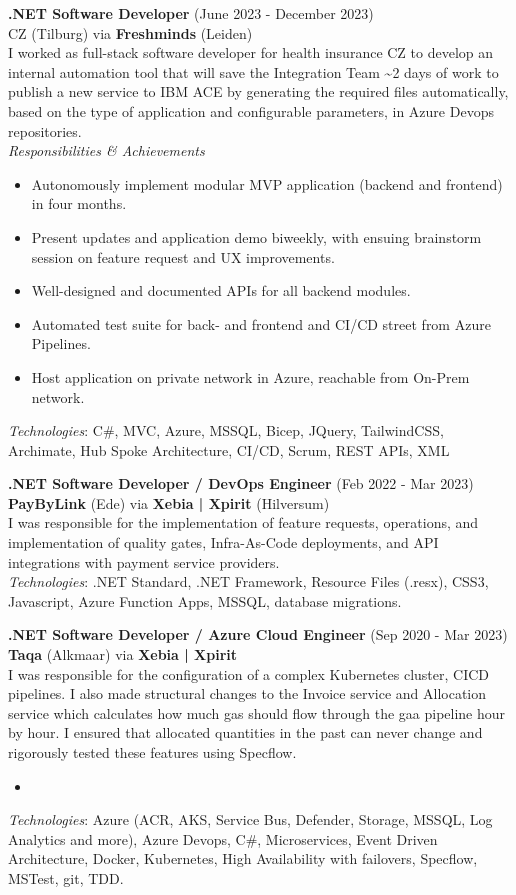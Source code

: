 \documentclass[a4paper,8pt]{article}
\begin{document}
\textbf{.NET Software Developer} (June 2023 - December 2023) \\
CZ (Tilburg) via \textbf{Freshminds} (Leiden) \\
I worked as full-stack software developer for health insurance CZ to develop an internal automation tool that will save the Integration Team \textasciitilde 2 days of work to publish a new service to IBM ACE by generating the required files automatically, based on the type of application and configurable parameters, in Azure Devops repositories. \\
\textit{Responsibilities \& Achievements}
\begin{itemize}
    \item Autonomously implement modular MVP application (backend and frontend) in four months.
    \item Present updates and application demo biweekly, with ensuing brainstorm session on feature request and UX improvements.
    \item Well-designed and documented APIs for all backend modules.
    \item Automated test suite for back- and frontend and CI/CD street from Azure Pipelines.
    \item Host application on private network in Azure, reachable from On-Prem network.
\end{itemize}
\textit{Technologies}: C\#, MVC, Azure, MSSQL, Bicep, JQuery, TailwindCSS, Archimate, Hub Spoke Architecture, CI/CD, Scrum, REST APIs, XML

\textbf{.NET Software Developer / DevOps Engineer} (Feb 2022 - Mar 2023) \\
\textbf{PayByLink} (Ede) via \textbf{Xebia | Xpirit} (Hilversum) \\
 I was responsible for the implementation of feature requests, operations, and implementation of quality gates, Infra-As-Code deployments, and API integrations with payment service providers.\\
\textit{Technologies}: .NET Standard, .NET Framework, Resource Files (.resx), CSS3, Javascript, Azure Function Apps, MSSQL, database migrations.


\textbf{.NET Software Developer / Azure Cloud Engineer} (Sep 2020 - Mar 2023) \\
\textbf{Taqa} (Alkmaar) via \textbf{Xebia | Xpirit} \\
 I was responsible for the configuration of a complex Kubernetes cluster, CI\/CD pipelines. 
 I also made structural changes to the Invoice service and Allocation service which calculates how much gas should flow through the gaa pipeline hour by hour. I ensured that allocated quantities in the past can never change and rigorously tested these features using Specflow. \\
 \begin{itemize}
  \item 
 \end{itemize}
\textit{Technologies}: Azure (ACR, AKS, Service Bus, Defender, Storage, MSSQL, Log Analytics and more), Azure Devops, C\#,  Microservices, Event Driven Architecture, Docker, Kubernetes, High Availability with failovers, Specflow, MSTest, git, TDD. 
\end{document}
